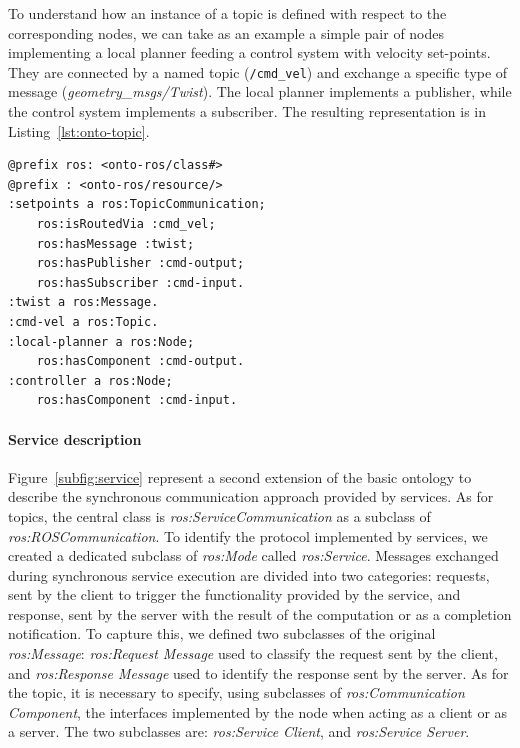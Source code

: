 To understand how an instance of a topic is defined with respect to the corresponding nodes, we can take as an example a simple pair of nodes implementing a local planner feeding a control system with velocity set-points. They are connected by a named topic (\texttt{/cmd\_vel}) and exchange a specific type of message (\textit{geometry\_msgs/Twist}). The local planner implements a publisher, while the control system implements a subscriber. The resulting representation is in Listing~\ref{lst:onto-topic}.

\begin{lstlisting}[frame=tb,caption={Instance of a topic-based communication according to the ontology.},label=lst:onto-topic]
@prefix ros: <onto-ros/class#>
@prefix : <onto-ros/resource/>
:setpoints a ros:TopicCommunication;
	ros:isRoutedVia :cmd_vel;
	ros:hasMessage :twist;
	ros:hasPublisher :cmd-output;
	ros:hasSubscriber :cmd-input.
:twist a ros:Message.
:cmd-vel a ros:Topic.  
:local-planner a ros:Node;
	ros:hasComponent :cmd-output.
:controller a ros:Node;
	ros:hasComponent :cmd-input.
 \end{lstlisting}

\paragraph{Service description} Figure~\ref{subfig:service} represent a second extension of the basic ontology to describe the synchronous communication approach provided by services.  As for topics, the central class is \textit{ros:Service\-Com\-mu\-ni\-ca\-tion} as a subclass of \textit{ros:ROS\-Com\-mu\-ni\-ca\-tion}. To identify the protocol implemented by services, we created a dedicated subclass of \textit{ros:Mode} called \textit{ros:Service}. Messages exchanged during synchronous service execution are divided into two categories: requests, sent by the client to trigger the functionality provided by the service, and response, sent by the server with the result of the computation or as a completion notification. To capture this, we defined two subclasses of the original \textit{ros:Message}: \textit{ros:Request Message} used to classify the request sent by the client, and \textit{ros:Response Message} used to identify the response sent by the server. As for the topic, it is necessary to specify, using subclasses of \textit{ros:Communication Component}, the interfaces implemented by the node when acting as a client or as a server. The two subclasses are: \textit{ros:Service Client}, and \textit{ros:Service Server}.

